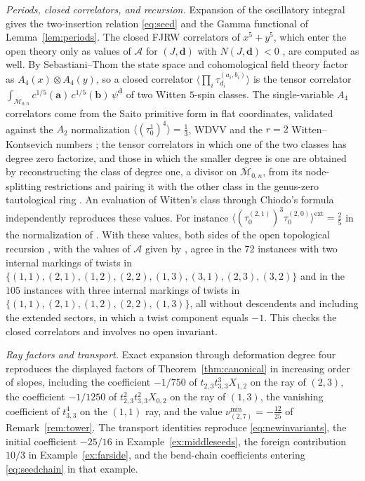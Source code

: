 \documentclass[11pt]{amsart}
\theoremstyle{definition}
\theoremstyle{remark}
\newcommand{\Mbar}{\overline{\mathcal{M}}}
\newcommand{\Ascr}{\mathcal{A}}
\begin{document}
\emph{Periods, closed correlators, and recursion.}
Expansion of the oscillatory integral gives the two-insertion relation
\eqref{eq:seed} and the Gamma functional of Lemma~\ref{lem:periods}.  The
closed FJRW correlators of $x^5+y^5$, which enter the open theory only as
values of $\Ascr$ for $(J,\mathbf d)$ with $N(J,\mathbf d)<0$
\cite[Cor.~5.11(3)]{GKT}, are computed as well.  By Sebastiani--Thom
\cite{FJR13} the state space and cohomological field theory factor as
$A_4(x)\otimes A_4(y)$, so a closed correlator
$\langle\prod_i\tau_{d_i}^{(a_i,b_i)}\rangle$ is the tensor correlator
$\int_{\Mbar_{0,n}}c^{1/5}(\mathbf a)\,c^{1/5}(\mathbf b)\,\psi^{\mathbf d}$
of two Witten $5$-spin classes.  The single-variable $A_4$ correlators come
from the Saito primitive form in flat coordinates, validated against the
$A_2$ normalization $\langle(\tau_0^1)^4\rangle=\tfrac13$, WDVV and the
$r=2$ Witten--Kontsevich numbers \cite{Kontsevich92}; the tensor correlators
in which one of the two classes has degree zero factorize, and those in which
the smaller degree is one are obtained by reconstructing the class of degree
one, a divisor on $\Mbar_{0,n}$, from its node-splitting restrictions and
pairing it with the other class in the genus-zero tautological ring
\cite{Keel92}.  An evaluation of Witten's class through Chiodo's formula
\cite{Chiodo08} independently reproduces these values.  For instance
$\langle(\tau_{0}^{(2,1)})^{3}\tau_{0}^{(2,0)}\rangle^{\mathrm{ext}}=\tfrac25$
in the normalization of \cite[Thm.~0.3]{GKT}.  With these values, both sides
of the open topological recursion \cite[Thm.~0.5]{GKT}, with the values of
$\Ascr$ given by \cite[Cor.~5.11]{GKT}, agree in the $72$ instances with two
internal markings of twists in
$\{(1,1),(2,1),(1,2),(2,2),(1,3),(3,1),(2,3),(3,2)\}$ and in the $105$
instances with three internal markings of twists in
$\{(1,1),(2,1),(1,2),(2,2),(1,3)\}$, all without descendents and including
the extended sectors, in which a twist component equals $-1$.  This checks
the closed correlators and involves no open invariant.

\emph{Ray factors and transport.}
Exact expansion through deformation degree four reproduces the displayed
factors of Theorem~\ref{thm:canonical} in increasing order of slopes,
including the coefficient $-1/750$ of $t_{2,3}t_{3,3}^3X_{1,2}$ on the ray of
$(2,3)$, the coefficient $-1/1250$ of $t_{2,3}^2t_{3,3}^2X_{0,2}$ on the ray
of $(1,3)$, the vanishing coefficient of $t_{3,3}^4$ on the $(1,1)$ ray, and
the value $\nu^{\min}_{(2,7)}=-\tfrac{12}{25}$ of Remark~\ref{rem:tower}.
The transport identities reproduce \eqref{eq:newinvariants}, the initial
coefficient $-25/16$ in Example~\ref{ex:middleseeds}, the foreign
contribution $10/3$ in Example~\ref{ex:farside}, and the bend-chain
coefficients entering \eqref{eq:seedchain} in that example.
\end{document}
